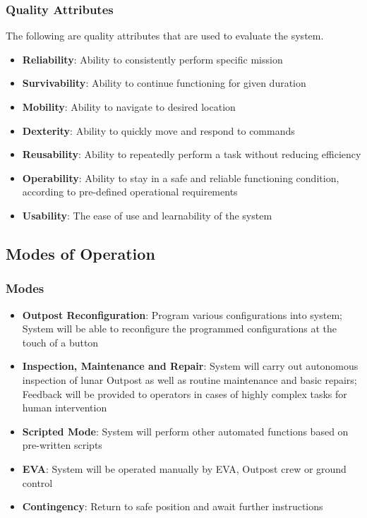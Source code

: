 \documentclass[12pt, letter]{article}
\begin{document}
\subsubsection{Quality Attributes}
\label{quality}
The following are quality attributes that are used to evaluate the system.
\begin{itemize}
\item{\textbf{Reliability}: Ability to consistently perform specific mission}
\item{\textbf{Survivability}: Ability to continue functioning for given duration}
\item{\textbf{Mobility}: Ability to navigate to desired location}
\item{\textbf{Dexterity}: Ability to quickly move and respond to commands}
\item{\textbf{Reusability}: Ability to repeatedly perform a task without reducing efficiency}
\item{\textbf{Operability}: Ability to stay in a safe and reliable functioning condition, according to pre-defined operational requirements}
\item{\textbf{Usability}: The ease of use and learnability of the system}
\end{itemize}
\subsection{Modes of Operation}
\subsubsection{Modes}
\label{modes}
\begin{itemize}[label={},leftmargin=0em]
\item{\textbf{Outpost Reconfiguration}: Program various configurations into system; System will be able to reconfigure the programmed configurations at the touch of a button}
\item{\textbf{Inspection, Maintenance and Repair}: System will carry out autonomous inspection of lunar Outpost as well as routine maintenance and basic repairs; Feedback will be provided to operators in cases of highly complex tasks for human intervention}
\item{\textbf{Scripted Mode}: System will perform other automated functions based on pre-written scripts}
\item{\textbf{EVA}: System will be operated manually by EVA, Outpost crew or ground control}
\item{\textbf{Contingency}: Return to safe position and await further instructions}
\end{itemize}
\end{document}
